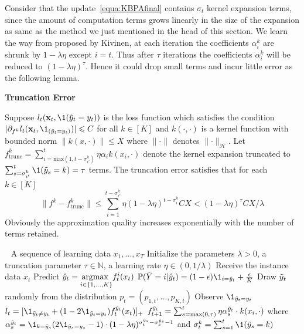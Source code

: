 Consider that the update~\ref{equa:KBPAfinal} contains $\sigma_t$ kernel expansion terms, since the amount of computation terms grows linearly in the size of the expansion as same as the method we just mentioned in the head of this section. We learn the way from \cite{kivinen2004online} proposed by Kivinen, at each iteration the coefficients $\alpha_i^k$ are shrunk by $1-\lambda \eta$ except $ i = t $. Thus after $\tau $ iterations the coefficients $\alpha_i^k$ will be reduced to $(1-\lambda\eta)^{\tau}$. Hence it could drop small terms and incur little error as the following lemma.

\begin{lema}\textbf{Truncation Error}

Suppose $l_t(\xt,\1(\ty=y_t))$ is the loss function which satisfies the condition $|\partial_{f^k}l_t(\xt,\1_{(\ty=y_t)})|\leqslant C$ for all $k\in[K]$ and $k(\cdot,\cdot)$ is a kernel function with bounded norm
$\parallel{k(x,\cdot)}\parallel\leqslant X$ where $\parallel{\cdot}\parallel$ denotes $\parallel{\cdot}\parallel_{\mathscr{H}}$. 
Let $f_{\text{trunc}}^k = \sum_{i=\text{max}(1,t-\sigma_{i'}^k)}^t\eta\alpha_ik(x_i,\cdot)$ denote the kernel expansion truncated to $\sum^t_{s=\sigma_{i'}^k}\1(\tilde{y}_s= k)=\tau$ terms. The truncation error satisfies that for each $k\in [K]$
\[\parallel{f^k-f^k_{\text{trunc}}}\parallel \leqslant \sum_{i=1}^{t-\sigma_{i'}^k}\eta(1-\lambda\eta)^{t-\sigma_{i}^k} CX < (1-\lambda\eta)^{\tau}CX/\lambda \]
Obviously the approximation quality increases exponentially with the number of terms retained.
\end{lema}

\begin{algo}
\label{algo:KBPASGD}
\begin{algorithmic}
\STATE	$\ \ $
\STATE	A sequence of learning data $x_1,\dots, x_T$
\STATE	Initialize the parameters $\lambda > 0$, a truncation parameter $\tau \in \mathbb{N}$, a learning rate $\eta\in(0,1/\lambda)$
	\STATE	Receive the instance data $x_t$
	\STATE	Predict $\hat{y}_t = \underset{i\in\{1,\dots,K\}}{\text{argmax }}f_t^i(x_t)$
		\STATE	$\mathbb{P}(\tilde{Y} =  i | \hy) = (1-\epsilon)\1_{i=\hy} +\frac{\epsilon}{K} $
	\ENDFOR	
	\STATE	Draw $\tilde{y}_t$ randomly from the distribution $p_t = (p_{1,t},\dots,p_{K,t})$
	\STATE	Observe $\1_{\ty = y_t}$
	\STATE	$l_t = [\1_{\ty\neq y_t} + (1-2\1_{\ty = y_t})f_t^{\ty}(x_t)]_+$
	\STATE	$f_{t+1}^{\tilde{y}_t} = \sum_{s=\text{max}(0,\tau)}^{t} \eta \alpha_s^{\tilde{y}_t}\cdot k(x_i,\cdot)$ 
	\STATE	where $\alpha_s^{\ty} = \1_{k=\tilde{y}_s}(2\1_{\tilde{y}_s = y_s}-1)\cdot (1-\lambda\eta)^{\sigma_t^{\tilde{y}_s}-\sigma_s^{\tilde{y}_s}-1}$ and $\sigma_t^k = \sum_{s=1}^{t}\1(\tilde{y}_s = k)$
\ENDFOR
\end{algorithmic}
\end{algo}

